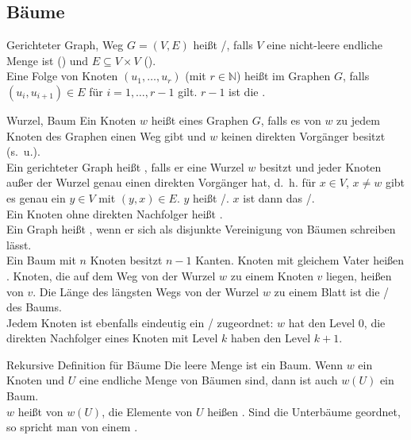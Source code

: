 \subsection{%
    Bäume%
}

\begin{Def}{Gerichteter Graph, Weg}
    $G = (V, E)$ heißt /, falls
    $V$ eine nicht-leere endliche Menge ist () und
    $E \subseteq V \times V$ (). \\
    Eine Folge von Knoten $(u_1, \ldots, u_r)$ (mit $r \in \mathbb{N}$) heißt
     im Graphen $G$, falls $(u_i, u_{i+1}) \in E$
    für $i = 1, \ldots, r - 1$ gilt.
    $r - 1$ ist die .
\end{Def}

\begin{Def}{Wurzel, Baum}
    Ein Knoten $w$ heißt  eines Graphen $G$, falls es von $w$
    zu jedem Knoten des Graphen einen Weg gibt und $w$ keinen direkten
    Vorgänger besitzt (s.~u.). \\
    Ein gerichteter Graph heißt , falls er eine Wurzel $w$
    besitzt und jeder Knoten außer der Wurzel genau einen direkten Vorgänger
    hat, d.~h. für $x \in V$, $x \not= w$ gibt es genau ein $y \in V$ mit
    $(y, x) \in E$.
    $y$ heißt /.
    $x$ ist dann das /. \\
    Ein Knoten ohne direkten Nachfolger heißt . \\
    Ein Graph heißt , wenn er sich als disjunkte Vereinigung
    von Bäumen schreiben lässt. \\
    Ein Baum mit $n$ Knoten besitzt $n - 1$ Kanten.
    Knoten mit gleichem Vater heißen .
    Knoten, die auf dem Weg von der Wurzel $w$ zu einem Knoten $v$
    liegen, heißen  von $v$.
    Die Länge des längsten Wegs von der Wurzel $w$ zu einem Blatt ist die
    / des Baums. \\
    Jedem Knoten ist ebenfalls eindeutig ein /
    zugeordnet: $w$ hat den Level $0$, die direkten Nachfolger eines Knoten
    mit Level $k$ haben den Level $k + 1$.
\end{Def}

\begin{Def}{Rekursive Definition für Bäume}
    Die leere Menge ist ein Baum. Wenn $w$ ein Knoten und $U$ eine endliche
    Menge von Bäumen sind, dann ist auch $w(U)$ ein Baum. \\
    $w$ heißt  von $w(U)$, die Elemente von $U$ heißen
    . Sind die Unterbäume geordnet, so spricht man von
    einem .
\end{Def}

